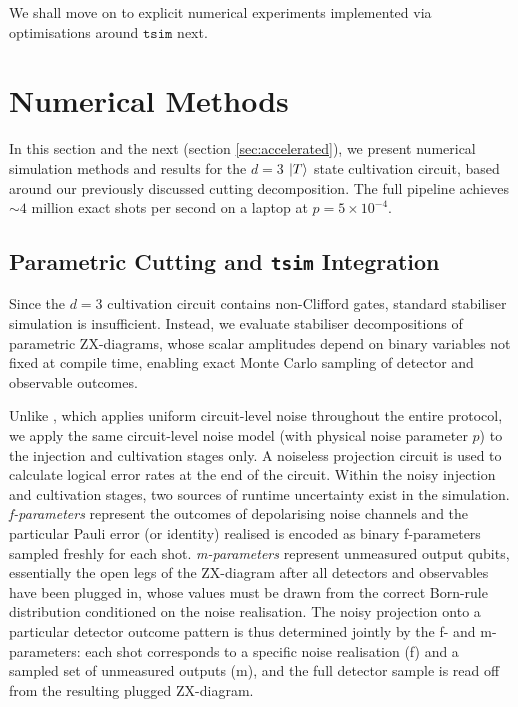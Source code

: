 \documentclass[a4paper,onecolumn,11pt,accepted=2026-06-10]{quantumarticle}
\begin{document}
We shall move on to explicit numerical experiments implemented via optimisations around $\mathtt{tsim}$ \cite{QuEraComputing_tsim_2026} next.

\section{Numerical Methods}
\label{sec:numerical-methods}
In this section and the next (section \ref{sec:accelerated}), we present numerical simulation methods and results for the $d=3$ $\ket{T}$ state cultivation circuit, based around our previously discussed cutting decomposition. The full pipeline achieves ${\sim}4$ million exact shots per second on a laptop at $p = 5 \times 10^{-4}$.

\subsection{Parametric Cutting and \texttt{tsim} Integration}
\label{sec:parametric-cutting}

Since the $d=3$ cultivation circuit contains non-Clifford gates, standard stabiliser simulation is insufficient. Instead, we evaluate stabiliser decompositions of parametric ZX-diagrams, whose scalar amplitudes depend on binary variables not fixed at compile time, enabling exact Monte Carlo sampling of detector and observable outcomes.

Unlike \cite{gidney2024magicstatecultivationgrowing}, which applies uniform circuit-level noise throughout the entire protocol, we apply the same circuit-level noise model (with physical noise parameter $p$) to the injection and cultivation stages only. A noiseless projection circuit is used to calculate logical error rates at the end of the circuit. Within the noisy injection and cultivation stages, two sources of runtime uncertainty exist in the simulation. \textit{f-parameters} represent the outcomes of depolarising noise channels and the particular Pauli error (or identity) realised is encoded as binary f-parameters sampled freshly for each shot. \textit{m-parameters} represent unmeasured output qubits, essentially the open legs of the ZX-diagram after all detectors and observables have been plugged in, whose values must be drawn from the correct Born-rule distribution conditioned on the noise realisation. The noisy projection onto a particular detector outcome pattern is thus determined jointly by the f- and m-parameters: each shot corresponds to a specific noise realisation (f) and a sampled set of unmeasured outputs (m), and the full detector sample is read off from the resulting plugged ZX-diagram.
\end{document}
